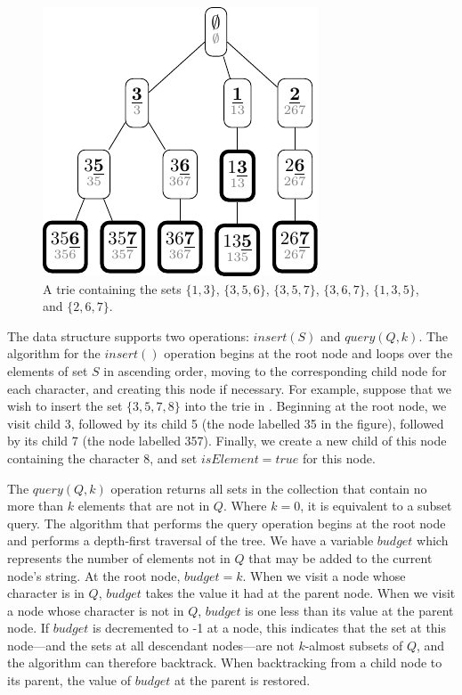 \begin{figure}[htb]
\centering
\includegraphics{50-trie/img/viz1}
\caption{A trie containing the sets
$\{1,3\}$,
$\{3,5,6\}$,
$\{3,5,7\}$,
$\{3,6,7\}$,
$\{1,3,5\}$, and
$\{2,6,7\}$.
}
\label{fig:viz1}
\end{figure}

The data structure supports two operations: $\mathit{insert}(S)$ and
$\mathit{query}(Q, k)$.  The algorithm for the $\mathit{insert}()$ operation
begins at the root node and loops over the elements of set $S$ in ascending order,
moving to the corresponding child node for each character, and
creating this node if necessary.  For example, suppose that we wish to insert
the set $\{3,5,7,8\}$ into the trie in .  Beginning at the root
node, we visit child 3, followed by its child 5 (the node labelled 35 in the
figure), followed by its child 7 (the node labelled 357).  Finally, we create a
new child of this node containing the character 8, and set
$\mathit{isElement}=\mathit{true}$ for this node.

The $\mathit{query}(Q, k)$ operation returns all sets in the collection that
contain no more than $k$ elements that are not in $Q$.  Where $k=0$, it is
equivalent to a subset query.
The algorithm that
performs the query operation begins at the root node and performs a depth-first
traversal of the tree.  We have a variable $\mathit{budget}$ which represents
the number of elements not in $Q$ that may be added to the current node's
string.  At the root node, $\mathit{budget}=k$.  When we visit a node whose
character is in $Q$, $\mathit{budget}$ takes the value it had at the parent
node.  When we visit a node whose character is not in $Q$, $\mathit{budget}$ is
one less than its value at the parent node.
If $\mathit{budget}$ is decremented to -1 at a node, this indicates that
the set at this node---and the sets at all descendant nodes---are not $k$-almost
subsets of $Q$, and the algorithm can therefore backtrack.
When backtracking from a child
node to its parent, the value of $\mathit{budget}$ at the parent is restored.

